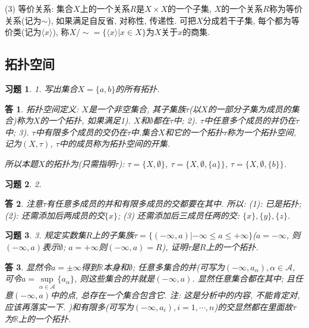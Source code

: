 \documentclass{ctexart}%
\newtheorem*{exercise}{习题}
\newtheorem*{solution}{答}
\theoremstyle{definition}
\theoremstyle{remark}
\begin{document}
(3) 等价关系: 集合$X$上的一个关系$R$是$X\times X$的一个子集, $X$的一个关系$R$称为等价关系(记为$\sim$), 如果满足自反省, 对称性, 传递性. 可把$X$分成若干子集, 每个都为等价类(记为$\langle x\rangle$), 称$X\slash \sim =\{ \langle x\rangle|x\in X\}$为$X$关于$x$的商集. 

\subsection{拓扑空间}

\begin{exercise}1. 写出集合$X=\{a,b\}$的所有拓扑.
\end{exercise}
\begin{solution}
拓扑空间定义: $X$是一个非空集合, 其子集族$\tau$(以$X$的一部分子集为成员的集合)称为$X$的一个拓扑, 如果满足1). $X$和$\emptyset$都在$\tau$中; 2). $\tau$中任意多个成员的并仍在$\tau$中; 3). $\tau$中有限多个成员的交仍在$\tau$中.集合$X$和它的一个拓扑$\tau$称为一个拓扑空间, 记为$(X,\tau)$, $\tau$中的成员称为拓扑空间的开集. 

所以本题$X$的拓扑为(只需指明$\tau$): $\tau=\{X,\emptyset\}$, $\tau=\{X,\emptyset,\{a\}\}$, $\tau=\{X,\emptyset,\{b\}\}$.
\end{solution}


\begin{exercise}2. 
\end{exercise}
\begin{solution}
注意$\tau$有任意多成员的并和有限多成员的交都要在其中. 所以: (1): 已是拓扑; (2): 还需添加后两成员的交$\{x\}$; (3) 还需添加后三成员任两的交:  $\{x\},\{y\},\{z\}$.
\end{solution}

\begin{exercise}3. 规定实数集$R$上的子集族$\tau=\{(-\infty,a)|-\infty\leq a\leq +\infty\}$($a=-\infty$,
则$(-\infty,a)$表示$\emptyset$; $a=+\infty$则$(-\infty,a)=R$), 证明$\tau$是$R$上的一个拓扑.
\end{exercise}
\begin{solution}
显然令$a=\pm\infty$得到$\mathbb{R}$本身和$\emptyset$; 任意多集合的并(可写为$(-\infty, a_\alpha),\alpha\in \mathscr{A}$, 可令$a=\sup\limits_{\alpha\in \mathscr{A}}\{a_\alpha\}$, 则这些集合的并就是$(-\infty, a)$. 显然任意集合都在其中; 且任意$(-\infty, a)$中的点, 总存在一个集合包含它. 注: 这是分析中的内容, 不能肯定对, 应该再落实一下. )和有限多(可写为$(-\infty,a_i),i=1,\cdots,n$)的交显然都在里面故$\tau$为$\mathbb{R}$上的一个拓扑. 
\end{solution}
\end{document}
